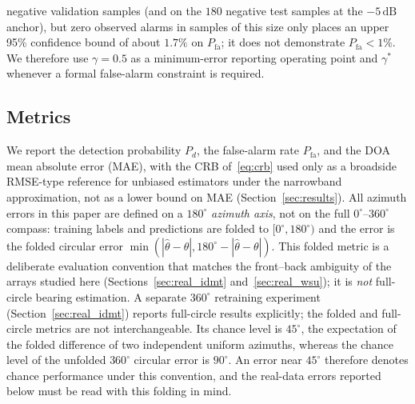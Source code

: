 \documentclass[sensors,article,submit,pdftex,moreauthors]{Definitions/mdpi}
\begin{document}
negative validation samples (and on the $180$ negative test samples at the $-5\,\mathrm{dB}$ anchor), but zero observed alarms in samples of this size only places an upper 95\% confidence bound of about $1.7\%$ on $P_{\mathrm{fa}}$; it does not demonstrate $P_{\mathrm{fa}}<1\%$. We therefore use $\gamma=0.5$ as a minimum-error reporting operating point and $\gamma^*$ whenever a formal false-alarm constraint is required.

\subsection{Metrics}
\label{sec:metrics}
We report the detection probability $P_d$, the false-alarm rate $P_{\mathrm{fa}}$, and the DOA mean absolute error (MAE), with the CRB of~\eqref{eq:crb} used only as a broadside RMSE-type reference for unbiased estimators under the narrowband approximation, not as a lower bound on MAE (Section~\ref{sec:results}).
All azimuth errors in this paper are defined on a $180^\circ$ \emph{azimuth axis}, not on the full $0^\circ$--$360^\circ$ compass: training labels and predictions are folded to $[0^\circ,180^\circ)$ and the error is the folded circular error $\min(|\hat\theta-\theta|,180^\circ-|\hat\theta-\theta|)$. This folded metric is a deliberate evaluation convention that matches the front--back ambiguity of the arrays studied here (Sections~\ref{sec:real_idmt} and~\ref{sec:real_wsu}); it is \emph{not} full-circle bearing estimation. A separate $360^\circ$ retraining experiment (Section~\ref{sec:real_idmt}) reports full-circle results explicitly; the folded and full-circle metrics are not interchangeable. Its chance level is $45^\circ$, the expectation of the folded difference of two independent uniform azimuths, whereas the chance level of the unfolded $360^\circ$ circular error is $90^\circ$. An error near $45^\circ$ therefore denotes chance performance under this convention, and the real-data errors reported below must be read with this folding in mind.
\end{document}
